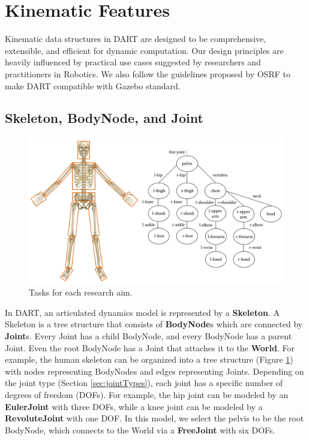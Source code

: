 \section{Kinematic Features}
Kinematic data structures in DART are designed to be comprehensive, extensible, and efficient for dynamic computation. Our design principles are heavily influenced by practical use cases suggested by researchers and practitioners in Robotics. We also follow the guidelines proposed by OSRF to make DART compatible with Gazebo standard.

\subsection{Skeleton, BodyNode, and Joint}
\begin{figure}
\centering
\includegraphics[width=6.0in]{fig/skeletonTree.jpg}
\caption{Tasks for each research aim.}
\label{fig:skeleton}
\end{figure}
 In DART, an articulated dynamics model is represented by a \textbf{Skeleton}. A Skeleton is a tree structure that consists of \textbf{BodyNode}s which are connected by \textbf{Joint}s. Every Joint has a child BodyNode, and every BodyNode has a parent Joint. Even the root BodyNode has a Joint that attaches it to the \textbf{World}. For example, the human skeleton can be organized into a tree structure (Figure \ref{fig:skeleton}) with nodes representing BodyNodes and edges representing Joints. Depending on the joint type (Section \ref{sec:jointTypes}), each joint has a specific number of degrees of freedom (DOFs). For example, the hip joint can be modeled by an \textbf{EulerJoint} with three DOFs, while a knee joint can be modeled by a \textbf{RevoluteJoint} with one DOF. In this model, we select the pelvis to be the root BodyNode, which connects to the World via a \textbf{FreeJoint} with six DOFs.

